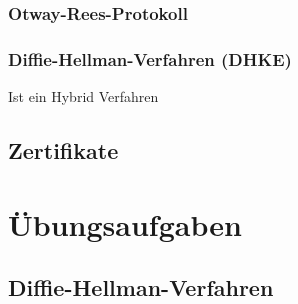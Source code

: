 \documentclass[a4paper]{article}
\begin{document}
\subsubsection{Otway-Rees-Protokoll}

\subsubsection{Diffie-Hellman-Verfahren (DHKE)}

Ist ein Hybrid Verfahren

\subsection{Zertifikate}


\section{Übungsaufgaben}

\subsection{Diffie-Hellman-Verfahren}
\end{document}
